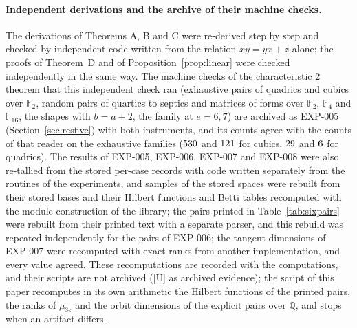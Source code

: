 \documentclass[11pt]{article}
\theoremstyle{definition}
\theoremstyle{remark}
\newcommand{\EXP}[1]{\mbox{EXP-#1}}
\newcommand{\Q}{\mathbb{Q}}
\newcommand{\F}{\mathbb{F}}
\begin{document}
\paragraph{Independent derivations and the archive of their machine checks.} The derivations of Theorems A, B and C were re-derived step by step and checked by independent code written from the relation $xy=yx+z$ alone; the proofs of Theorem~D and of Proposition~\ref{prop:linear} were checked independently in the same way. The machine checks of the characteristic $2$ theorem that this independent check ran (exhaustive pairs of quadrics and cubics over $\F_2$, random pairs of quartics to septics and matrices of forms over $\F_2$, $\F_4$ and $\F_{16}$, the shapes with $b=a+2$, the family at $e=6,7$) are archived as \EXP{005} (Section~\ref{sec:resfive}) with both instruments, and its counts agree with the counts of that reader on the exhaustive families ($530$ and $121$ for cubics, $29$ and $6$ for quadrics). The results of \EXP{005}, \EXP{006}, \EXP{007} and \EXP{008} were also re-tallied from the stored per-case records with code written separately from the routines of the experiments, and samples of the stored spaces were rebuilt from their stored bases and their Hilbert functions and Betti tables recomputed with the module construction of the library; the pairs printed in Table~\ref{tab:sixpairs} were rebuilt from their printed text with a separate parser, and this rebuild was repeated independently for the pairs of \EXP{006}; the tangent dimensions of \EXP{007} were recomputed with exact ranks from another implementation, and every value agreed. These recomputations are recorded with the computations, and their scripts are not archived ([U] as archived evidence); the script of this paper recomputes in its own arithmetic the Hilbert functions of the printed pairs, the ranks of $\mu_{3e}$ and the orbit dimensions of the explicit pairs over $\Q$, and stops when an artifact differs.
\end{document}
